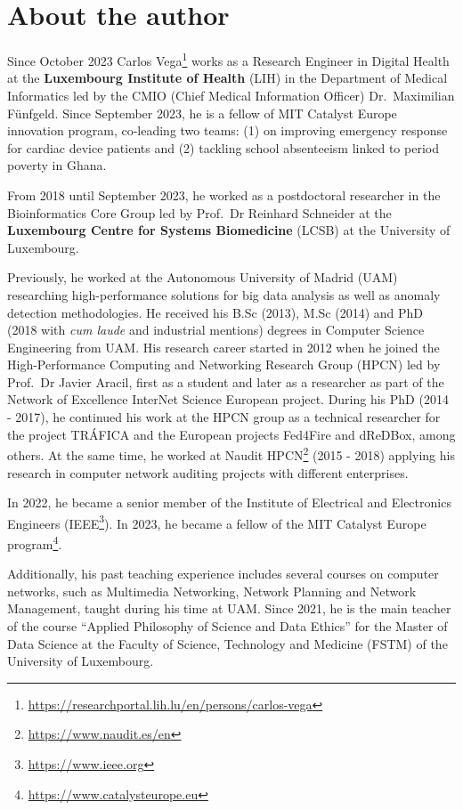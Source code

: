 \documentclass[
  12pt,
]{book}
\DeclareRobustCommand{\href}[2]{#2\footnote{\url{#1}}}
\begin{document}
\section*{About the author}\label{about-the-author}

Since October 2023 \href{https://researchportal.lih.lu/en/persons/carlos-vega}{Carlos Vega} works as a Research Engineer in Digital Health at the \textbf{Luxembourg Institute of Health} (LIH) in the Department of Medical Informatics led by the CMIO (Chief Medical Information Officer) Dr.~Maximilian Fünfgeld. Since September 2023, he is a fellow of MIT Catalyst Europe innovation program, co-leading two teams: (1) on improving emergency response for cardiac device patients and (2) tackling school absenteeism linked to period poverty in Ghana.

From 2018 until September 2023, he worked as a postdoctoral researcher in the Bioinformatics Core Group led by Prof.~Dr Reinhard Schneider at the \textbf{Luxembourg Centre for Systems Biomedicine} (LCSB) at the University of Luxembourg.

Previously, he worked at the Autonomous University of Madrid (UAM) researching high-performance solutions for big data analysis as well as anomaly detection methodologies. He received his B.Sc (2013), M.Sc (2014) and PhD (2018 with \emph{cum laude} and industrial mentions) degrees in Computer Science Engineering from UAM. His research career started in 2012 when he joined the High-Performance Computing and Networking Research Group (HPCN) led by Prof.~Dr Javier Aracil, first as a student and later as a researcher as part of the Network of Excellence InterNet Science European project. During his PhD (2014 - 2017), he continued his work at the HPCN group as a technical researcher for the project TRÁFICA and the European projects Fed4Fire and dReDBox, among others. At the same time, he worked at \href{https://www.naudit.es/en}{Naudit HPCN} (2015 - 2018) applying his research in computer network auditing projects with different enterprises.

In 2022, he became a senior member of the Institute of Electrical and Electronics Engineers (\href{https://www.ieee.org}{IEEE}). In 2023, he became a fellow of the \href{https://www.catalysteurope.eu}{MIT Catalyst Europe program}.

Additionally, his past teaching experience includes several courses on computer networks, such as Multimedia Networking, Network Planning and Network Management, taught during his time at UAM. Since 2021, he is the main teacher of the course ``Applied Philosophy of Science and Data Ethics'' for the Master of Data Science at the Faculty of Science, Technology and Medicine (FSTM) of the University of Luxembourg.
\end{document}
